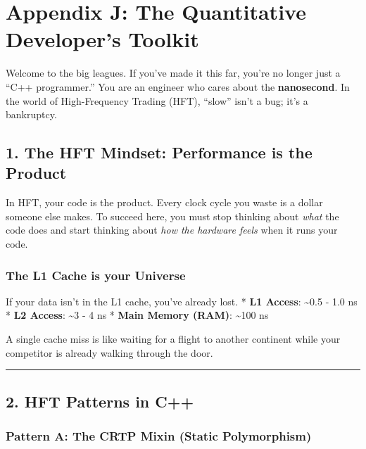 \hypertarget{appendix-j-the-quantitative-developers-toolkit}{%
\section{Appendix J: The Quantitative Developer's
Toolkit}\label{appendix-j-the-quantitative-developers-toolkit}}

Welcome to the big leagues. If you've made it this far, you're no longer
just a ``C++ programmer.'' You are an engineer who cares about the
\textbf{nanosecond}. In the world of High-Frequency Trading (HFT),
``slow'' isn't a bug; it's a bankruptcy.

\hypertarget{the-hft-mindset-performance-is-the-product}{%
\subsection{1. The HFT Mindset: Performance is the
Product}\label{the-hft-mindset-performance-is-the-product}}

In HFT, your code is the product. Every clock cycle you waste is a
dollar someone else makes. To succeed here, you must stop thinking about
\emph{what} the code does and start thinking about \emph{how the
hardware feels} when it runs your code.

\hypertarget{the-l1-cache-is-your-universe}{%
\subsubsection{The L1 Cache is your
Universe}\label{the-l1-cache-is-your-universe}}

If your data isn't in the L1 cache, you've already lost. * \textbf{L1
Access}: \textasciitilde0.5 - 1.0 ns * \textbf{L2 Access}:
\textasciitilde3 - 4 ns * \textbf{Main Memory (RAM)}: \textasciitilde100
ns

A single cache miss is like waiting for a flight to another continent
while your competitor is already walking through the door.

\begin{center}\rule{0.5\linewidth}{0.5pt}\end{center}

\hypertarget{hft-patterns-in-c}{%
\subsection{2. HFT Patterns in C++}\label{hft-patterns-in-c}}

\hypertarget{pattern-a-the-crtp-mixin-static-polymorphism}{%
\subsubsection{Pattern A: The CRTP Mixin (Static
Polymorphism)}\label{pattern-a-the-crtp-mixin-static-polymorphism}}

